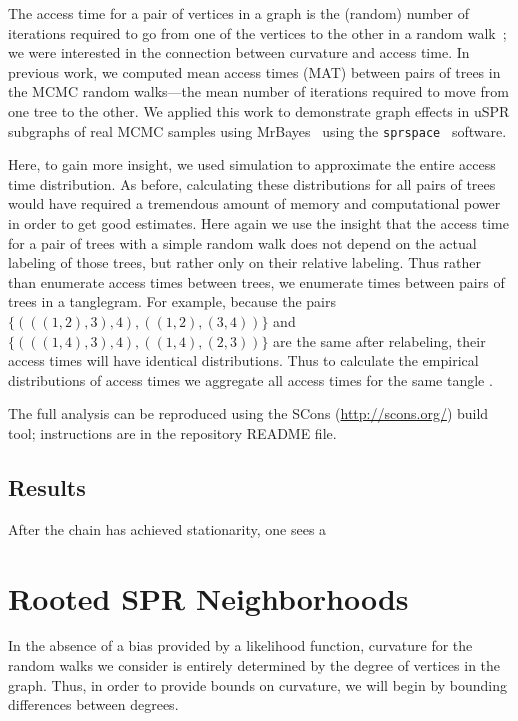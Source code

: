 \documentclass[11pt,onecolumn,conference]{IEEEtran}
\begin{document}
The access time for a pair of vertices in a graph is the (random) number of iterations required to go from one of the vertices to the other in a random walk~\cite{lovasz1993random}; we were interested in the connection between curvature and access time.
In previous work, we computed mean access times (MAT) between pairs of trees in the MCMC random walks---the mean number of iterations required to move from one tree to the other.
We applied this work to demonstrate graph effects in uSPR subgraphs of real MCMC samples using MrBayes~\cite{Whidden2015-yi} using the \texttt{sprspace}~\cite{sprspace} software.

Here, to gain more insight, we used simulation to approximate the entire access time distribution.
As before, calculating these distributions for all pairs of trees would have required a tremendous amount of memory and computational power in order to get good estimates.
Here again we use the insight that the access time for a pair of trees with a simple random walk does not depend on the actual labeling of those trees, but rather only on their relative labeling.
Thus rather than enumerate access times between trees, we enumerate times between pairs of trees in a tanglegram.
For example, because the pairs
$\{(((1,2),3),4), ((1,2),(3,4))\}$ and
$\{(((1,4),3),4), ((1,4),(2,3))\}$
are the same after relabeling, their access times will have identical distributions.
Thus to calculate the empirical distributions of access times we aggregate all access times for the same tangle .

The full analysis can be reproduced using the SCons (\url{http://scons.org/}) build tool; instructions are in the repository README file.


\subsection{Results}

After the chain has achieved stationarity, one sees a


\section{Rooted SPR Neighborhoods}

In the absence of a bias provided by a likelihood function, curvature for the random walks we consider is entirely determined by the degree of vertices in the graph.
Thus, in order to provide bounds on curvature, we will begin by bounding differences between degrees.
\end{document}
